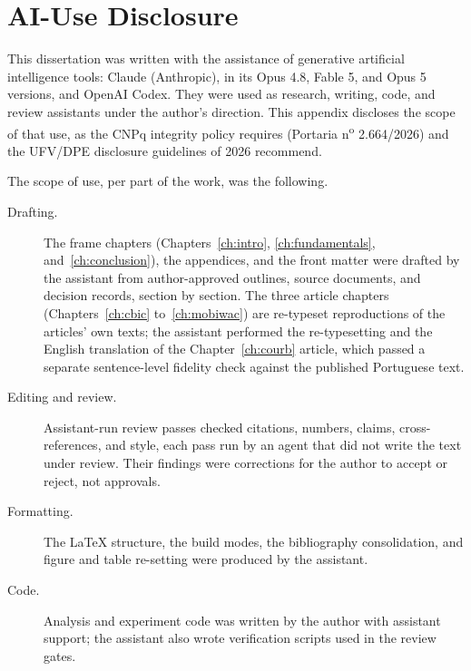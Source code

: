 
\chapter{AI-Use Disclosure}
\label{apx:ai}

This dissertation was written with the assistance of generative artificial
intelligence tools: Claude (Anthropic), in its Opus 4.8, Fable 5, and Opus 5 versions,
and OpenAI Codex. They were used as research, writing, code, and review assistants under
the author's direction. This appendix
discloses the scope of that use, as the CNPq integrity policy requires (Portaria
n\textsuperscript{o} 2.664/2026) and the UFV/DPE disclosure guidelines of 2026 recommend.

The scope of use, per part of the work, was the following.

\begin{description}
  \item[Drafting.] The frame chapters (Chapters~\ref{ch:intro}, \ref{ch:fundamentals},
        and~\ref{ch:conclusion}), the appendices, and the front matter were drafted by
        the assistant from author-approved outlines, source documents, and decision
        records, section by section. The three article chapters
        (Chapters~\ref{ch:cbic} to~\ref{ch:mobiwac}) are re-typeset reproductions of
        the articles' own texts; the assistant performed the re-typesetting and the
        English translation of the Chapter~\ref{ch:courb} article, which passed a
        separate sentence-level fidelity check against the published Portuguese text.
  \item[Editing and review.] Assistant-run review passes checked citations, numbers,
        claims, cross-references, and style, each pass run by an agent that did not
        write the text under review. Their findings were corrections for the author to
        accept or reject, not approvals.
  \item[Formatting.] The LaTeX structure, the build modes, the bibliography
        consolidation, and figure and table re-setting were produced by the assistant.
  \item[Code.] Analysis and experiment code was written by the author with assistant
        support; the assistant also wrote verification scripts used in the review
        gates.
\end{description}

